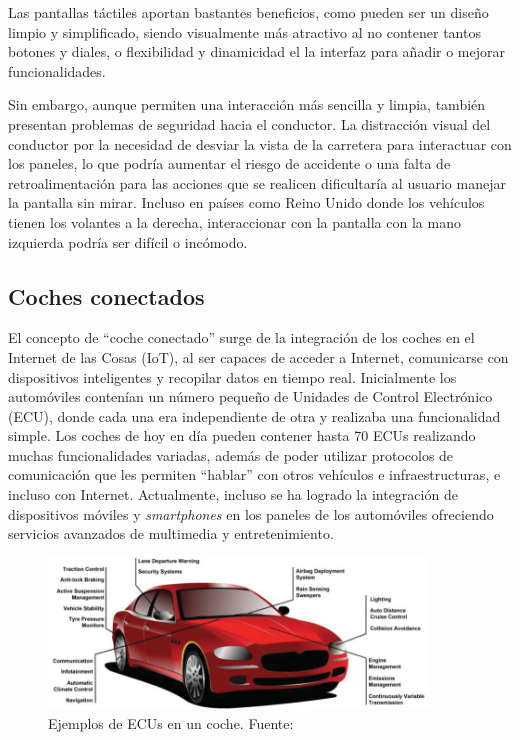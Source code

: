 \documentclass[12pt]{report} %
\begin{document}
Las pantallas táctiles aportan bastantes beneficios, como pueden ser un diseño limpio y simplificado, siendo visualmente más atractivo al no contener tantos botones y diales, o flexibilidad y dinamicidad el la interfaz para añadir o mejorar funcionalidades.

Sin embargo, aunque permiten una interacción más sencilla y limpia, también presentan problemas de seguridad hacia el conductor. La distracción visual del conductor por la necesidad de desviar la vista de la carretera para interactuar con los paneles, lo que podría aumentar el riesgo de accidente o una falta de retroalimentación para las acciones que se realicen dificultaría al usuario manejar la pantalla sin mirar. Incluso en países como Reino Unido donde los vehículos tienen los volantes a la derecha, interaccionar con la pantalla con la mano izquierda podría ser difícil o incómodo. 

\subsection{Coches conectados}

El concepto de “coche conectado” surge de la integración de los coches en el Internet de las Cosas (IoT), al ser capaces de acceder a Internet, comunicarse con dispositivos inteligentes y recopilar datos en tiempo real. Inicialmente los automóviles contenían un número pequeño de Unidades de Control Electrónico (ECU), donde cada una era independiente de otra y realizaba una funcionalidad simple. Los coches de hoy en día pueden contener hasta 70 ECUs realizando muchas funcionalidades variadas, además de poder utilizar protocolos de comunicación que les permiten “hablar” con otros vehículos e infraestructuras, e incluso con Internet. Actualmente, incluso se ha logrado la integración de dispositivos móviles y \textit{smartphones} en los paneles de los automóviles ofreciendo servicios avanzados de multimedia y entretenimiento. 
\cite{mobileIntegration}

\begin{figure}[h]
    \centering
    \includegraphics[width=0.9\textwidth]{ecu.png}
    \caption{Ejemplos de ECUs en un coche. Fuente: \cite{mobileIntegration}}
    \label{fig:imagen3}
\end{figure}
\end{document}
